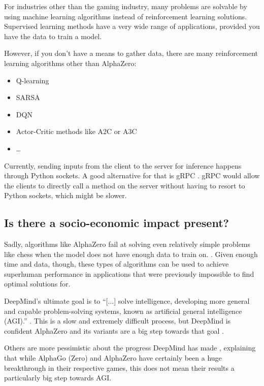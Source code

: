 \documentclass{article}
\begin{document}
For industries other than the gaming industry, many problems are solvable by using
machine learning algorithms instead of reinforcement learning solutions. 
Supervised learning methods have a very wide range of applications, provided 
you have the data to train a model.

However, if you don't have a means to gather data, there are many reinforcement
learning algorithms other than AlphaZero:

\begin{itemize}
    \item Q-learning
    \item SARSA
    \item DQN
    \item Actor-Critic methods like A2C or A3C
    \item \dots
\end{itemize}

Currently, sending inputs from the client to the server for inference
happens through Python sockets. A good alternative for that is gRPC \cite{IntroductionGRPC}. 
gRPC would allow the clients to directly call a method on the server without having to 
resort to Python sockets, which might be slower. 

\subsection{Is there a socio-economic impact present?}

Sadly, algorithms like AlphaZero fail at solving even relatively simple problems like chess when the model 
does not have enough data to train on.  \cite{ThomasMoerlandPostdoc}. 
Given enough time and data, though, these types of algorithms can be used to achieve superhuman
performance in applications that were previously impossible to find optimal solutions for.

DeepMind's ultimate goal is to ``[...] solve intelligence, developing more general and capable 
problem-solving systems, known as artificial general intelligence (AGI).'' \cite{DeepMind}.
This is a slow and extremely difficult process, but DeepMind is confident AlphaZero and 
its variants are a big step towards that goal \cite{AlphaZeroSheddingNew}.

Others are more pessimistic about the progress DeepMind has made \cite{moerlandEmailExchangeTuur22, dukezhouAnswerAlphaZeroExample2018},
explaining that while AlphaGo (Zero) and AlphaZero have certainly been a huge breakthrough in their respective games, 
this does not mean their results a particularly big step towards AGI. 
\end{document}
